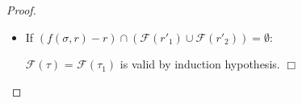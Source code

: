 {\begin{proof}
\begin{itemize}
\begin{itemize}
             $\mathcal{F}(\tau) $ has the root $(r'_0 - f(\sigma,[\sigma])):\sigma$ , Assume $r'$ to be valid, 
             then either $f(\sigma,r')$[1] or $f(\sigma,r')$[2]  should be intuitionistically valid then either $r'_1 \supseteq  f(\sigma,r')[2]$ or $r'_1 \supseteq  f(\sigma,r')[2]$ should be intuitionistically valid. 
             We know, by induction hypothesis, that both are intuitionistically invalid, which yields a contradiction.

             \item
             If $(f(\sigma,r) - r) \cap (\mathcal{F}(r'_1) \cup \mathcal{F}(r'_2) ) = \emptyset $: 
             
             $\mathcal{F}(\tau) $ = $\mathcal{F}(\tau_1) $ is valid by induction hypothesis.  \hfill $\Box$
        \end{itemize}
    
        \end{itemize}
    
    \end{proof}
}



